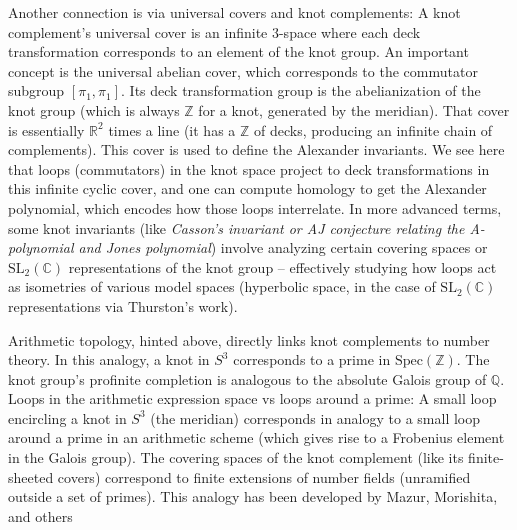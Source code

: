 \documentclass[11pt]{article}
\theoremstyle{remark}
\begin{document}
Another connection is via universal covers and knot complements: A knot complement’s universal cover is an infinite 3-space where each deck transformation corresponds to an element of the knot group. An important concept is the universal abelian cover, which corresponds to the commutator subgroup $[\pi_1,\pi_1]$. Its deck transformation group is the abelianization of the knot group (which is always $\mathbb{Z}$ for a knot, generated by the meridian). That cover is essentially $\mathbb{R}^2$ times a line (it has a $\mathbb{Z}$ of decks, producing an infinite chain of complements). This cover is used to define the Alexander invariants. We see here that loops (commutators) in the knot space project to deck transformations in this infinite cyclic cover, and one can compute homology to get the Alexander polynomial, which encodes how those loops interrelate. In more advanced terms, some knot invariants (like \textit{Casson’s invariant or AJ conjecture relating the A-polynomial and Jones polynomial}) involve analyzing certain covering spaces or $\mathrm{SL}_2(\mathbb{C})$ representations of the knot group – effectively studying how loops act as isometries of various model spaces (hyperbolic space, in the case of $\mathrm{SL}_2(\mathbb{C})$ representations via Thurston’s work).

Arithmetic topology, hinted above, directly links knot complements to number theory. In this analogy, a knot in $S^3$ corresponds to a prime in $\mathrm{Spec}(\mathbb{Z})$. The knot group’s profinite completion is analogous to the absolute Galois group of $\mathbb{Q}$. Loops in the arithmetic expression space vs loops around a prime: A small loop encircling a knot in $S^3$ (the meridian) corresponds in analogy to a small loop around a prime in an arithmetic scheme (which gives rise to a Frobenius element in the Galois group). The covering spaces of the knot complement (like its finite-sheeted covers) correspond to finite extensions of number fields (unramified outside a set of primes). This analogy has been developed by Mazur, Morishita, and others
\end{document}
